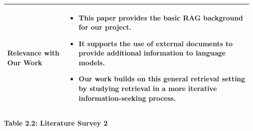 \documentclass[12pt,a4paper]{report}
\begin{document}
\begin{longtable}{|p{1.25in}|p{5.15in}|}
\textbf{Relevance with Our Work} &
\begin{itemize}[leftmargin=0.18in,itemsep=0.05in,topsep=0pt,parsep=0pt]
\item This paper provides the basic RAG background for our project.
\item It supports the use of external documents to provide additional information to language models.
\item Our work builds on this general retrieval setting by studying retrieval in a more iterative information-seeking process.
\end{itemize} \\ \hline
\end{longtable}
\clearpage


\begin{center}\textbf{Table 2.2: Literature Survey 2}\end{center}
\end{document}
